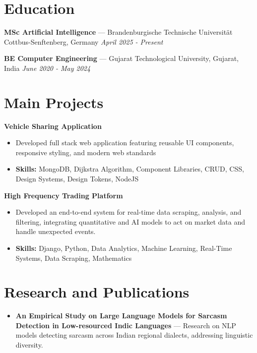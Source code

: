 \documentclass[a4paper,10pt]{article}
\begin{document}
\section*{Education}
\textbf{MSc Artificial Intelligence} — Brandenburgische Technische Universität Cottbus-Senftenberg, Germany \hfill \textit{April 2025 - Present}\par
\vspace{1.5pt}
\textbf{BE Computer Engineering} — Gujarat Technological University, Gujarat, India \hfill \textit{June 2020 - May 2024}\par

\section*{Main Projects}
\textbf{Vehicle Sharing Application}\par
\vspace{1pt}
\begin{itemize}
  \item Developed full stack web application featuring reusable UI components, responsive styling, and modern web standards
  \item \textbf{Skills:} MongoDB, Dijkstra Algorithm, Component Libraries, CRUD, CSS, Design Systems, Design Tokens, NodeJS
\end{itemize}
\vspace{3pt}
\textbf{High Frequency Trading Platform}\par
\vspace{1pt}
\begin{itemize}
  \item Developed an end-to-end system for real-time data scraping, analysis, and filtering, integrating quantitative and AI models to act on market data and handle unexpected events.
  \item \textbf{Skills:} Django, Python, Data Analytics, Machine Learning, Real-Time Systems, Data Scraping, Mathematics
\end{itemize}

\section*{Research and Publications}
\begin{itemize}
\item \textbf{An Empirical Study on Large Language Models for Sarcasm Detection in Low-resourced Indic Languages} — Research on NLP models detecting sarcasm across Indian regional dialects, addressing linguistic diversity.
\end{itemize}
\end{document}
